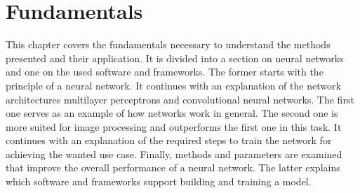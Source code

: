 \chapter{Fundamentals}
This chapter covers the fundamentals necessary to understand the methods presented and their application.
It is divided into a section on neural networks and one on the used software and frameworks.
The former starts with the principle of a neural network.
It continues with an explanation of the network architectures multilayer perceptrons and convolutional neural networks.
The first one serves as an example of how networks work in general.
The second one is more suited for image processing and outperforms the first one in this task.
It continues with an explanation of the required steps to train the network for achieving the wanted use case.
Finally, methods and parameters are examined that improve the overall performance of a neural network.
The latter explains which software and frameworks support building and training a model.



